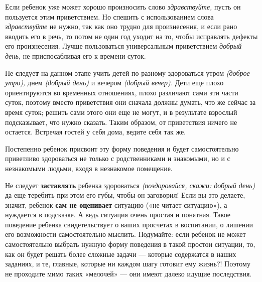 \documentclass{book}
\renewcommand{\emph}[1]{\textit{#1}}
\begin{document}
Если ребенок уже может хорошо произносить слово \emph{здравствуйте,}
пусть он пользуется этим приветствием. Но спешить с использованием слова
\emph{здравствуйте} не нужно, так как оно трудно для произнесения, и
если рано вводить его в речь, то потом не один год уходит на то, чтобы
исправлять дефекты его произнесения. Лучше пользоваться универсальным
приветствием \emph{добрый день,} не приспосабливая его к времени суток.

Не \textbf{с}ледуе\textbf{т} на данном этапе учить детей по-разному
здороваться утром \emph{(доброе утро),} днем \emph{(добрый день)} и
вечером \emph{(добрый вечер).} Дети еще плохо ориентируются во временных
отношениях, плохо различают сами эти части суток, поэтому вместо
приветствия они сначала должны думать, что же сейчас за время суток;
решить сами этого они еще не могут, и в результате взрослый
подсказывает, что нужно сказать. Таким образом, от приветствия ничего не
остается. Встречая гостей у себя дома, ведите себя так же.

Постепенно ребенок присвоит эту форму поведения и будет самостоятельно
приветливо здороваться не только с родственниками и знакомыми, но и с
незнакомыми людьми, входя в незнакомое помещение.

Не следует \textbf{заставлять} ребенка здороваться \emph{(поздоровайся,
скажи: добрый день)} да еще теребить при этом его губы, чтобы он
заговорил! Если вы это делаете, значит, ребенок \textbf{сам не
оценивает} ситуацию («не читает ситуацию»), а нуждается в подсказке. А
ведь ситуация очень простая и понятная. Такое поведение ребенка
свидетельствует о ваших просчетах в воспитании, о лишении его
возможности самостоятельно мыслить. Подумайте: если ребенок не может
самостоятельно выбрать нужную форму поведения в такой простои ситуации,
то, как он будет решать более сложные задачи --- которые содержатся в
наших заданиях, и те, главные, которые ни каждом шагу готовит ему
жизнь?! Поэтому не проходите мимо таких «мелочей» --- они имеют далеко
идущие последствия.
\end{document}
